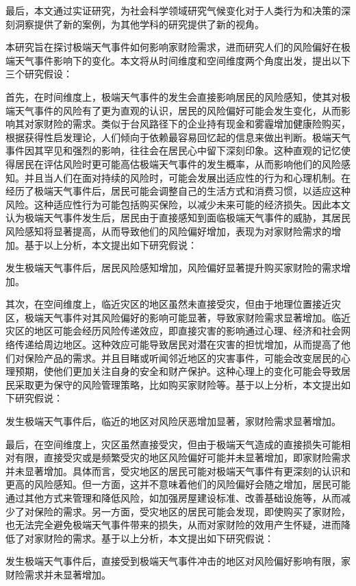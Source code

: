 最后，本文通过实证研究，为社会科学领域研究气候变化对于人类行为和决策的深刻洞察提供了新的案例，为其他学科的研究提供了新的视角。

本研究旨在探讨极端天气事件如何影响家财险需求，进而研究人们的风险偏好在极端天气事件影响下的变化。本文将从时间维度和空间维度两个角度出发，提出以下三个研究假设：

首先，在时间维度上，极端天气事件的发生会直接影响居民的风险感知，使其对极端天气事件的风险有了更为直观的认识，居民的风险偏好可能会发生变化，从而影响其对家财险的需求。类似于台风路径下的企业持有现金\citep{0Do}和雾霾增加健康险购买\citep{赵强2021空气污染对商业健康保险需求的影响}，根据获得性启发理论\citep{tversky1973availability}，人们倾向于依赖最容易回忆起的信息来做出判断。极端天气事件因其罕见和强烈的影响，往往会在居民心中留下深刻印象。这种直观的记忆使得居民在评估风险时更可能高估极端天气事件的发生概率，从而影响他们的风险感知。并且当人们在面对持续的风险时，可能会发展出适应性的行为和心理机制\citep{gigerenzer2011heuristic}。在经历了极端天气事件后，居民可能会调整自己的生活方式和消费习惯，以适应这种风险。这种适应性行为可能包括购买保险，以减少未来可能的经济损失。因此本文认为极端天气事件发生后，居民由于直接感知到面临极端天气事件的威胁，其居民风险感知将显著提高，从而导致他们的风险偏好增加，表现为对家财险需求的增加。基于以上分析，本文提出如下研究假说：

\begin{hyp} \label{hyp:1}
    发生极端天气事件后，居民风险感知增加，风险偏好显著提升购买家财险的需求增加。
\end{hyp}

其次，在空间维度上，临近灾区的地区虽然未直接受灾，但由于地理位置接近灾区，极端天气事件对其风险偏好的影响可能显著\citep{0Do}，导致家财险需求显著增加。临近灾区的地区可能会经历风险传递效应，即直接灾害的影响通过心理、经济和社会网络传递给周边地区。这种效应可能导致居民对潜在灾害的担忧增加，从而提高了他们对保险产品的需求。并且目睹或听闻邻近地区的灾害事件，可能会改变居民的心理预期，使他们更加关注自身的安全和财产保护。这种心理上的变化可能会导致居民采取更为保守的风险管理策略，比如购买家财险等。基于以上分析，本文提出如下研究假说：

\begin{hyp} \label{hyp:3}
    发生极端天气事件后，临近的地区对风险厌恶增加显著，家财险需求显著增加。
\end{hyp}

最后，在空间维度上，灾区虽然直接受灾，但由于极端天气造成的直接损失可能相对有限，直接受灾或是频繁受灾的地区风险偏好可能并未显著增加\citep{shao2024typhoons}，即家财险需求并未显著增加。具体而言，受灾地区的居民可能对极端天气事件有更深刻的认识和更高的风险感知。但一方面，这并不意味着他们的风险偏好会随之增加，居民可能通过其他方式来管理和降低风险，如加强房屋建设标准、改善基础设施等，从而减少了对保险的需求。另一方面，受灾地区的居民可能会发现，即使购买了家财险，也无法完全避免极端天气事件带来的损失，从而对家财险的效用产生怀疑，进而降低了对家财险的需求。基于以上分析，本文提出如下研究假说：

\begin{hyp} \label{hyp:2}
    发生极端天气事件后，直接受到极端天气事件冲击的地区对风险偏好影响有限，家财险需求并未显著增加。
\end{hyp}
